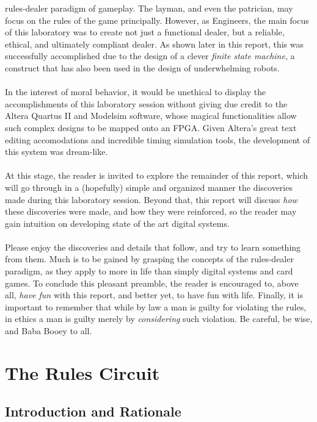 \documentclass[12pt]{report}
\begin{document}
rules-dealer paradigm of gameplay. The layman, and even the patrician, may focus on the rules of the
game principally. However, as Engineers, the main focus of this laboratory was to create not just a
functional dealer, but a reliable, ethical, and ultimately compliant dealer. As shown later in this
report, this was successfully accomplished due to the design of a clever \textit{finite state
machine}, a construct that has also been used in the design of underwhelming robots.\\\\
In the interest of moral behavior, it would be unethical to display the accomplishments of this
laboratory session without giving due credit to the Altera Quartus II and Modelsim software, whose
magical functionalities allow such complex designs to be mapped onto an FPGA. Given Altera's great
text editing accomodations and incredible timing simulation tools, the development of this system
was dream-like.\\\\
At this stage, the reader is invited to explore the remainder of this report, which will go through
in a (hopefully) simple and organized manner the discoveries made during this laboratory session.
Beyond that, this report will discuss \textit{how} these discoveries were made, and how they were
reinforced, so the reader may gain intuition on developing state of the art digital systems.\\\\
Please enjoy the discoveries and details that follow, and try to learn something from them. Much is
to be gained
by grasping the concepts of the rules-dealer paradigm, as they apply to more in life than simply
digital systems and card games. To conclude this pleasant preamble, the reader is encouraged to,
above all, \textit{have fun} with this report, and better yet, to have fun with life. Finally, it is
important to remember that while by law a man is guilty for violating the rules, in ethics a man is
guilty merely by \textit{considering} such violation. Be careful, be wise, and Baba Booey to all.

\part{The Rules Circuit}

\chapter*{Introduction and Rationale}
\label{s:intro2}
\end{document}
